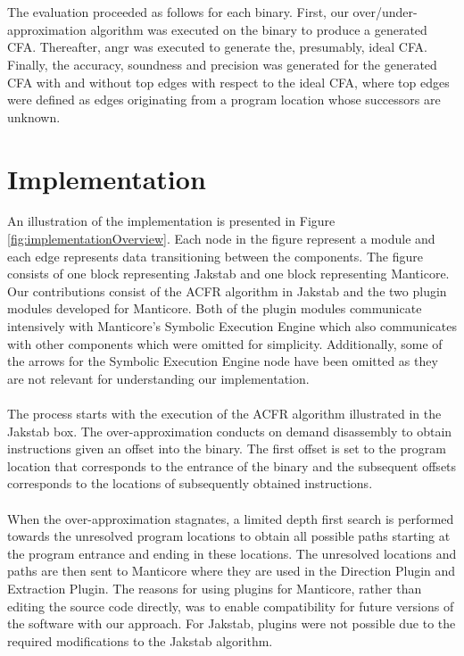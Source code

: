 \documentclass{kththesis}
\newcommand{\fbcomment}[1]{{#1}}
\renewcommand{\fbcomment}[1]{}
\begin{document}
\\ \\
The evaluation proceeded as follows for each binary. First, our over/under-approximation algorithm was executed on the binary to produce a generated CFA. Thereafter, angr was executed to generate the, presumably, ideal CFA. Finally, the accuracy, soundness and precision was generated for the generated CFA with and without top edges with respect to the ideal CFA, where top edges were defined as edges originating from a program location whose successors are unknown.

\section{Implementation}
\fbcomment{\color{red}Goal: Describe how Manticore was implemented (Considering to remove this section as I am not sure that is it "scientifically relevant")}
An illustration of the implementation is presented in Figure \ref{fig:implementationOverview}. Each node in the figure represent a module and each edge represents data transitioning between the components. The figure consists of one block representing Jakstab and one block representing Manticore. Our contributions consist of the ACFR algorithm in Jakstab and the two plugin modules developed for Manticore. Both of the plugin modules communicate intensively with Manticore's Symbolic Execution Engine which also communicates with other components which were omitted for simplicity. Additionally, some of the arrows for the Symbolic Execution Engine node have been omitted as they are not relevant for understanding our implementation.
\\ \\
The process starts with the execution of the ACFR algorithm illustrated in the Jakstab box. The over-approximation conducts on demand disassembly to obtain instructions given an offset into the binary. The first offset is set to the program location that corresponds to the entrance of the binary and the subsequent offsets corresponds to the locations of subsequently obtained instructions. 
\\ \\
When the over-approximation stagnates, a limited depth first search is performed towards the unresolved program locations to obtain all possible paths starting at the program entrance and ending in these locations. The unresolved locations and paths are then sent to Manticore where they are used in the Direction Plugin and Extraction Plugin. The reasons for using plugins for Manticore, rather than editing the source code directly, was to enable compatibility for future versions of the software with our approach. For Jakstab, plugins were not possible due to the required modifications to the Jakstab algorithm.
\end{document}
